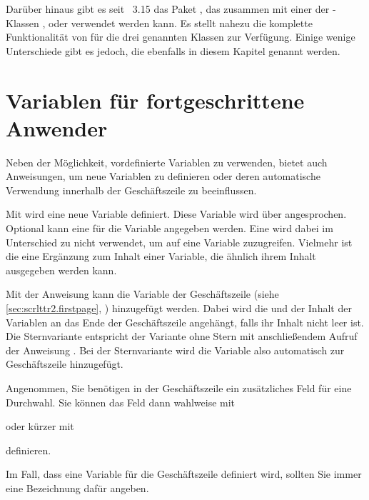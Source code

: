 %
Darüber hinaus gibt es seit
\KOMAScript~3.15 das Paket
, das zusammen mit einer der
\KOMAScript-Klassen ,  oder 
verwendet werden kann. Es stellt nahezu die komplette Funktionalität von
 für die drei genannten Klassen zur Verfügung. Einige wenige
Unterschiede gibt es jedoch, die ebenfalls in diesem Kapitel genannt werden.%


\section{Variablen für fortgeschrittene Anwender}
\BeginIndexGroup
{}

Neben der Möglichkeit, vordefinierte Variablen zu verwenden, bietet
\KOMAScript{} auch Anweisungen, um neue Variablen zu definieren oder deren
automatische Verwendung innerhalb der Geschäftszeile zu beeinflussen.


\begin{Declaration}
\end{Declaration}
Mit  wird eine neue Variable definiert. Diese Variable wird
über  angesprochen. Optional kann eine  für die
Variable  angegeben werden. Eine  wird dabei im
Unterschied zu  nicht verwendet, um auf eine Variable
zuzugreifen. Vielmehr ist die  eine Ergänzung zum Inhalt
einer Variable, die ähnlich ihrem Inhalt ausgegeben werden kann. 

Mit der Anweisung  kann die Variable  der
Geschäftszeile
(siehe \autoref{sec:scrlttr2.firstpage},
) hinzugefügt werden. Dabei wird die
 und der Inhalt der Variablen an das Ende der
Geschäftszeile angehängt, falls ihr Inhalt nicht leer ist. Die Sternvariante
 entspricht der Variante ohne Stern mit anschließendem
Aufruf der Anweisung . Bei der Sternvariante wird die
Variable also automatisch zur Geschäftszeile hinzugefügt.
\begin{Example}
  Angenommen, Sie benötigen in der Geschäftszeile ein zusätzliches Feld
  für eine Durchwahl. Sie können das Feld dann wahlweise mit
\begin{lstcode}
\end{lstcode}
  oder kürzer mit
\begin{lstcode}
\end{lstcode}
  definieren.
\end{Example}
Im Fall, dass eine Variable für die Geschäftszeile
definiert wird, sollten Sie immer eine Bezeichnung dafür angeben.

